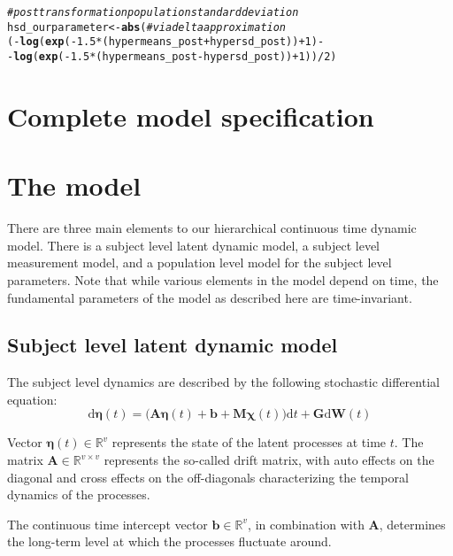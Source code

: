 \documentclass[nojss]{jss}\usepackage[]{graphicx}\usepackage[]{color}
\makeatletter
\newcommand{\hlnum}[1]{\textcolor[rgb]{0.686,0.059,0.569}{#1}}%
\newcommand{\hlcom}[1]{\textcolor[rgb]{0.678,0.584,0.686}{\textit{#1}}}%
\newcommand{\hlopt}[1]{\textcolor[rgb]{0,0,0}{#1}}%
\newcommand{\hlstd}[1]{\textcolor[rgb]{0.345,0.345,0.345}{#1}}%
\newcommand{\hlkwb}[1]{\textcolor[rgb]{0.69,0.353,0.396}{#1}}%
\newcommand{\hlkwd}[1]{\textcolor[rgb]{0.737,0.353,0.396}{\textbf{#1}}}%
\newenvironment{kframe}{%
 \def\at@end@of@kframe{}%
 \ifinner\ifhmode%
  \def\at@end@of@kframe{\end{minipage}}%
  \begin{minipage}{\columnwidth}%
 \fi\fi%
 \def\FrameCommand##1{\hskip\@totalleftmargin \hskip-\fboxsep
 \colorbox{shadecolor}{##1}\hskip-\fboxsep
     \hskip-\linewidth \hskip-\@totalleftmargin \hskip\columnwidth}%
 \MakeFramed {\advance\hsize-\width
   \@totalleftmargin\z@ \linewidth\hsize
   \@setminipage}}%
 {\par\unskip\endMakeFramed%
 \at@end@of@kframe}
\newenvironment{knitrout}{}{} %
\newcommand{\vect}[1]{\boldsymbol{\mathbf{#1}}}
\makeatother
\begin{document}
\begin{knitrout}
\begin{kframe}
\begin{alltt}
\hlcom{#post transformation population standard deviation}
\hlstd{hsd_ourparameter} \hlkwb{<-} \hlkwd{abs}\hlstd{(} \hlcom{#via delta approximation}
  \hlstd{(}\hlopt{-}\hlkwd{log}\hlstd{(}\hlkwd{exp}\hlstd{(}\hlopt{-}\hlnum{1.5} \hlopt{*} \hlstd{(hypermeans_post} \hlopt{+} \hlstd{hypersd_post))} \hlopt{+} \hlnum{1}\hlstd{)} \hlopt{-}
   \hlopt{-}\hlkwd{log}\hlstd{(}\hlkwd{exp}\hlstd{(}\hlopt{-}\hlnum{1.5} \hlopt{*} \hlstd{(hypermeans_post} \hlopt{-} \hlstd{hypersd_post))} \hlopt{+} \hlnum{1}\hlstd{) )} \hlopt{/} \hlnum{2}\hlstd{)}
\end{alltt}
\end{kframe}
\end{knitrout}



\section{Complete model specification}
\section{The model}
There are three main elements to our hierarchical continuous time dynamic model. There is a subject level latent dynamic model, a subject level measurement model, and a population level model for the subject level parameters. Note that while various elements in the model depend on time, the fundamental parameters of the model as described here are time-invariant.

\subsection{Subject level latent dynamic model}
The subject level dynamics are described by the following stochastic differential equation:
\begin{equation}
\label{eq:process1}
\mathrm{d} \vect{\eta} (t) =
\bigg( 
\vect{A \eta} (t) +
\vect{b} +
\vect{M \chi} (t)  
\bigg) \mathrm{d} t +
\vect{G} \mathrm{d} \vect{W}(t)  
\end{equation}

Vector $ \vect{\eta} (t)\in\mathbb{R}^{v}$ represents the state of the latent processes at time $t$. The matrix $ \vect{A} \in \mathbb{R}^{v \times v}$ represents the so-called drift matrix, with auto effects on the diagonal and cross effects on the off-diagonals characterizing the temporal dynamics of the processes. 

The continuous time intercept vector $ \vect{b} \in\mathbb{R}^{v}$, in combination with $\vect{A}$, determines the long-term level at which the processes fluctuate around.
\end{document}
